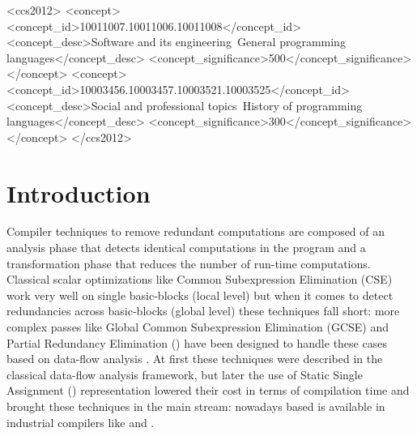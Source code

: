 \documentclass[acmlarge,review,anonymous]{acmart}\settopmatter{printfolios=true}
\begin{document}
\begin{CCSXML}
<ccs2012>
<concept>
<concept_id>10011007.10011006.10011008</concept_id>
<concept_desc>Software and its engineering~General programming languages</concept_desc>
<concept_significance>500</concept_significance>
</concept>
<concept>
<concept_id>10003456.10003457.10003521.10003525</concept_id>
<concept_desc>Social and professional topics~History of programming languages</concept_desc>
<concept_significance>300</concept_significance>
</concept>
</ccs2012>
\end{CCSXML}





\maketitle


\section{Introduction}
\label{sec:intro}
Compiler techniques to remove redundant computations are composed of an analysis
phase that detects identical computations in the program and a transformation
phase that reduces the number of run-time computations.  Classical scalar
optimizations like Common Subexpression Elimination (CSE) \cite{dragonbook} work
very well on single basic-blocks (local level) but when it comes to detect
redundancies across basic-blocks (global level) these techniques fall short:
more complex passes like Global Common Subexpression Elimination (GCSE) and
Partial Redundancy Elimination (\PRE{}) have been designed to handle these cases
based on data-flow analysis \cite{morel1979global}.  At first these techniques
were described in the classical data-flow analysis framework, but later the use
of Static Single Assignment (\SSA{}) representation lowered their cost in terms
of compilation time \cite{briggs1994effective,chow1997new,kennedy1999partial}
and brought these techniques in the main stream: nowadays \SSA{} based \PRE{} is
available in industrial compilers like \GCC{} and \LLVM{}.
\end{document}
